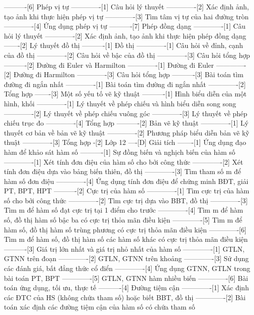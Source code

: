 ----------[6] Phép vị tự
-------------[1] Câu hỏi lý thuyết
-------------[2] Xác định ảnh, tạo ảnh khi thực hiện phép vị tự
-------------[3] Tìm tâm vị tự của hai đường tròn
-------------[4] Ứng dụng phép vị tự
----------[7] Phép đồng dạng
-------------[1] Câu hỏi lý thuyết
-------------[2] Xác định ảnh, tạo ảnh khi thực hiện phép đồng dạng
-------[2] Lý thuyết đồ thị
----------[1] Đồ thị
-------------[1] Câu hỏi về đỉnh, cạnh của đồ thị
-------------[2] Câu hỏi về bậc của đồ thị
-------------[3] Câu hỏi tổng hợp
----------[2] Đường đi Euler và Harmilton
-------------[1] Đường đi Euler
-------------[2] Đường đi Harmilton
-------------[3] Câu hỏi tổng hợp
----------[3] Bài toán tìm đường đi ngắn nhất
-------------[1] Bài toán tìm đường đi ngắn nhất
-------------[2] Tổng hợp
-------[3] Một số yếu tố vẽ kỹ thuật
----------[1] Hình biểu diễn của một hình, khối
-------------[1] Lý thuyết về phép chiếu và hình biểu diễn song song
-------------[2] Lý thuyết về phép chiếu vuông góc
-------------[3] Lý thuyết về phép chiếu trục đo
-------------[4] Tổng hợp
----------[2] Bản vẽ kỹ thuật
-------------[1] Lý thuyết cơ bản về bản vẽ kỹ thuật
-------------[2] Phương pháp biểu diễn bản vẽ kỹ thuật
-------------[3] Tổng hợp
-[2] Lớp 12
----[D] Giải tích
-------[1] Ứng dụng đạo hàm để khảo sát hàm số
----------[1] Sự đồng biến và nghịch biến của hàm số
-------------[1] Xét tính đơn điệu của hàm số cho bởi công thức
-------------[2] Xét tính đơn điệu dựa vào bảng biến thiên, đồ thị
-------------[3] Tìm tham số m để hàm số đơn điệu
-------------[4] Ứng dụng tính đơn điệu để chứng minh BĐT, giải PT, BPT, HPT
----------[2] Cực trị của hàm số
-------------[1] Tìm cực trị của hàm số cho bởi công thức
-------------[2] Tìm cực trị dựa vào BBT, đồ thị
-------------[3] Tìm m để hàm số đạt cực trị tại 1 điểm cho trước
-------------[4] Tìm m để hàm số, đồ thị hàm số bậc ba có cực trị thỏa mãn điều kiện
-------------[5] Tìm m để hàm số, đồ thị hàm số trùng phương có cực trị thỏa mãn điều kiện
-------------[6] Tìm m để hàm số, đồ thị hàm số các hàm số khác có cực trị thỏa mãn điều kiện
----------[3] Giá trị lớn nhất và giá trị nhỏ nhất của hàm số
-------------[1] GTLN, GTNN trên đoạn
-------------[2] GTLN, GTNN trên khoảng
-------------[3] Sử dụng các đánh giá, bất đẳng thức cổ điển
-------------[4] Ứng dụng GTNN, GTLN trong bài toán PT, BPT
-------------[5] GTLN, GTNN hàm nhiều biến
-------------[6] Bài toán ứng dụng, tối ưu, thực tế
----------[4] Đường tiệm cận
-------------[1] Xác định các ĐTC của HS (không chứa tham số) hoặc biết BBT, đồ thị
-------------[2] Bài toán xác định các đường tiệm cận của hàm số có chứa tham số
